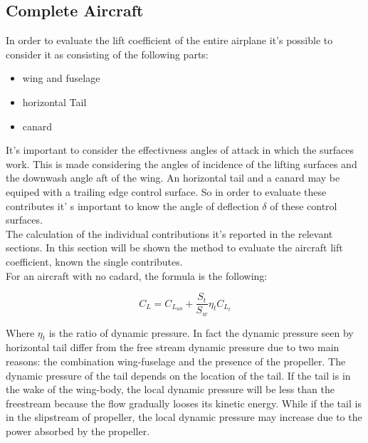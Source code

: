 		




\subsection{Complete Aircraft}

In order to evaluate the lift coefficient of the entire airplane it's possible to consider it as consisting of the following parts\cite{ roskam2002airplane}:

\begin{itemize}
\item wing and fuselage
\item horizontal Tail
\item canard
\end{itemize}

It's important to consider the effectivness angles of attack in which the surfaces work. This is made considering the angles of incidence of the lifting surfaces and the downwash angle aft of the wing. An horizontal tail and a canard may be equiped with a trailing edge control surface. So in order to evaluate these contributes it' s important to know the angle of deflection $\delta$ of these control surfaces.\\
The calculation of the individual contributions it's reported in the relevant sections. In this section will be shown the method to evaluate the aircraft lift coefficient, known the single contributes.\\
For an aircraft with no cadard, the formula is the following:

\begin{equation}
C_L = C_{L_{wb}} + \frac{S_t}{S_w} \eta_t C_{L_{t}}
\end{equation}

Where $\eta_t$ is the ratio of dynamic pressure. In fact the dynamic pressure seen by horizontal tail differ from the free stream dynamic pressure due to two main reasons: the combination wing-fuselage and the presence of the propeller. The dynamic pressure of the tail depends on the location of the tail. If the tail is in the wake of the wing-body, the local dynamic pressure will be less than the freestream because the flow gradually looses its kinetic energy. While if the tail is in the slipstream of propeller, the local dynamic pressure may increase due to the power absorbed by the propeller.




